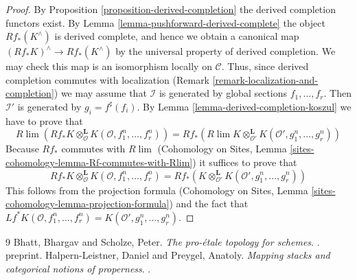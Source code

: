 \documentclass[10pt,a4paper]{amsart}
\theoremstyle{plain}
\theoremstyle{definition}
\theoremstyle{remark}
\numberwithin{equation}{subsection}
\def\lim{\mathop{\mathrm{lim}}\nolimits}
\begin{document}
\begin{proof}
By Proposition \ref{proposition-derived-completion} the derived completion
functors exist. By Lemma \ref{lemma-pushforward-derived-complete} the object
$Rf_*(K^\wedge)$ is derived complete, and hence we obtain a canonical map
$(Rf_*K)^\wedge \to Rf_*(K^\wedge)$ by the universal property of derived
completion. We may check this map is an isomorphism locally on $\mathcal{C}$.
Thus, since derived completion commutes with localization
(Remark \ref{remark-localization-and-completion}) we may assume
that $\mathcal{I}$ is generated by global sections $f_1, \ldots, f_r$.
Then $\mathcal{I}'$ is generated by $g_i = f^\sharp(f_i)$. By
Lemma \ref{lemma-derived-completion-koszul}
we have to prove that
$$
R\lim \left(
Rf_*K \otimes^\mathbf{L}_\mathcal{O} K(\mathcal{O}, f_1^n, \ldots, f_r^n)
\right)
=
Rf_*\left(
R\lim
K \otimes^\mathbf{L}_{\mathcal{O}'} K(\mathcal{O}', g_1^n, \ldots, g_r^n)
\right)
$$
Because $Rf_*$ commutes with $R\lim$
(Cohomology on Sites, Lemma
\ref{sites-cohomology-lemma-Rf-commutes-with-Rlim})
it suffices to prove that
$$
Rf_*K \otimes^\mathbf{L}_\mathcal{O} K(\mathcal{O}, f_1^n, \ldots, f_r^n) =
Rf_*\left(
K \otimes^\mathbf{L}_{\mathcal{O}'} K(\mathcal{O}', g_1^n, \ldots, g_r^n)
\right)
$$
This follows from the projection formula (Cohomology on Sites, Lemma
\ref{sites-cohomology-lemma-projection-formula}) and the fact that
$Lf^*K(\mathcal{O}, f_1^n, \ldots, f_r^n) =
K(\mathcal{O}', g_1^n, \ldots, g_r^n)$.
\end{proof}

\begin{thebibliography}{9}
Bhatt, Bhargav and Scholze, Peter.
\newblock \emph{The pro-\'etale topology for schemes}.
. preprint.
Halpern-Leistner, Daniel and Preygel, Anatoly.
\newblock \emph{Mapping stacks and categorical notions of properness}.
.
\end{thebibliography}
\end{document}

